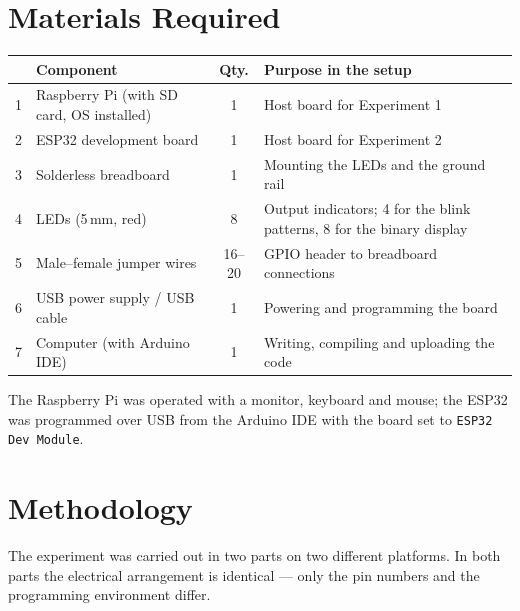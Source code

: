 \documentclass[10pt,a4paper]{article}
\begin{document}
\section{Materials Required}

\noindent
\begin{tabularx}{\textwidth}{@{}p{0.4cm} >{\raggedright\arraybackslash}p{5.2cm} c X@{}}
\toprule
\rowcolor{soft}
\multicolumn{1}{@{}l}{\textbf{\#}} & \textbf{Component} & \textbf{Qty.} & \textbf{Purpose in the setup} \\
\midrule
1 & Raspberry Pi (with SD card, OS installed) & 1 & Host board for Experiment 1 \\
2 & ESP32 development board                   & 1 & Host board for Experiment 2 \\
3 & Solderless breadboard                     & 1 & Mounting the LEDs and the ground rail \\
4 & LEDs (5\,mm, red)                         & 8 & Output indicators; 4 for the blink patterns, 8 for the binary display \\
5 & Male--female jumper wires                 & 16--20 & GPIO header to breadboard connections \\
6 & USB power supply / USB cable              & 1 & Powering and programming the board \\
7 & Computer (with Arduino IDE)               & 1 & Writing, compiling and uploading the code \\
\bottomrule
\end{tabularx}

\vspace{4pt}
\begin{notebox}
The Raspberry Pi was operated with a monitor, keyboard and mouse; the ESP32 was
programmed over USB from the Arduino IDE with the board set to
\texttt{ESP32 Dev Module}.
\end{notebox}

\section{Methodology}

The experiment was carried out in two parts on two different platforms. In both
parts the electrical arrangement is identical --- only the pin numbers and the
programming environment differ.
\end{document}

